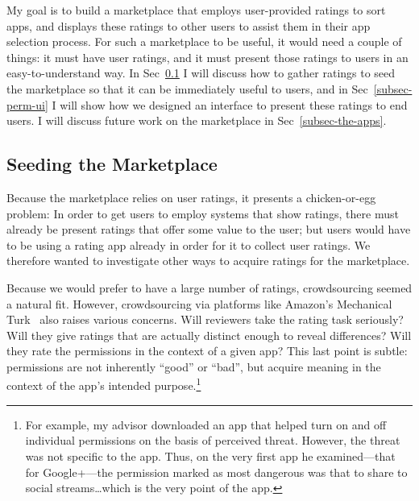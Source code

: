 \documentclass[11pt]{article}
\begin{document}
My goal is to build a marketplace that employs user-provided 
ratings to sort apps, and displays these ratings to other users 
to assist them in their app selection process. For such a marketplace
to be useful, it would need a couple of things:  it must have
user ratings, and it must present those ratings to users in
an easy-to-understand way. In Sec~\ref{subsec-seeding} I will 
discuss how to gather ratings to seed the marketplace so that 
it can be immediately useful to users, and in Sec~\ref{subsec-perm-ui}
I will show how we designed an interface to present these ratings 
to end users. I will discuss future work on the marketplace in 
Sec~\ref{subsec-the-apps}.

\subsection{Seeding the Marketplace}
\label{subsec-seeding}
Because the marketplace relies on user ratings, it presents 
a chicken-or-egg problem: In order to get users
to employ systems that show ratings, there must already be present
ratings that offer some value to the user; but users would have to be
using a rating app already in order for it to collect user
ratings. We therefore wanted to investigate other ways to
acquire ratings for the marketplace.

Because we would prefer to have a large number of ratings,
crowdsourcing seemed a natural fit. However, crowdsourcing via
platforms like Amazon's Mechanical Turk~\cite{amazon-mturk} 
also raises various concerns. Will
reviewers take the rating task seriously? Will they give ratings that
are actually distinct enough to reveal differences? Will they rate the
permissions in the context of a given app? This last point is subtle: permissions are
not inherently ``good'' or ``bad'', but acquire meaning in the context
of the app's intended purpose.\footnote{For example, my advisor
  downloaded an app that helped turn on and off individual permissions
  on the basis of perceived threat. However, the threat was not
  specific to the app. Thus, on the very first app he examined---that
  for Google+---the permission marked as most dangerous was that to
  share to social streams\dots which is the very point of the app.}
\end{document}
